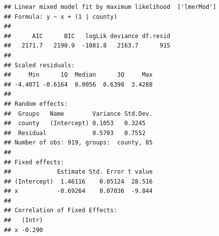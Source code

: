 \documentclass[ignorenonframetext,]{beamer}
\begin{document}
\begin{frame}[fragile]{}

\begin{verbatim}
## Linear mixed model fit by maximum likelihood  ['lmerMod']
## Formula: y ~ x + (1 | county)
## 
##      AIC      BIC   logLik deviance df.resid 
##   2171.7   2190.9  -1081.8   2163.7      915 
## 
## Scaled residuals: 
##     Min      1Q  Median      3Q     Max 
## -4.4071 -0.6164  0.0056  0.6398  3.4288 
## 
## Random effects:
##  Groups   Name        Variance Std.Dev.
##  county   (Intercept) 0.1053   0.3245  
##  Residual             0.5703   0.7552  
## Number of obs: 919, groups:  county, 85
## 
## Fixed effects:
##             Estimate Std. Error t value
## (Intercept)  1.46116    0.05124  28.516
## x           -0.69264    0.07036  -9.844
## 
## Correlation of Fixed Effects:
##   (Intr)
## x -0.290
\end{verbatim}


\end{frame}
\end{document}
